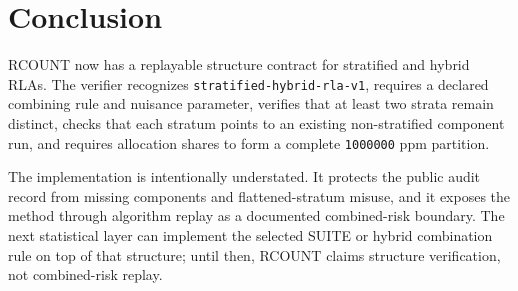 \section{Conclusion}

RCOUNT now has a replayable structure contract for stratified and hybrid RLAs.
The verifier recognizes \texttt{stratified-hybrid-rla-v1}, requires a declared
combining rule and nuisance parameter, verifies that at least two strata remain
distinct, checks that each stratum points to an existing non-stratified
component run, and requires allocation shares to form a complete
\texttt{1000000} ppm partition.

The implementation is intentionally understated. It protects the public audit
record from missing components and flattened-stratum misuse, and it exposes the
method through algorithm replay as a documented combined-risk boundary. The
next statistical layer can implement the selected SUITE or hybrid combination
rule on top of that structure; until then, RCOUNT claims structure
verification, not combined-risk replay.
